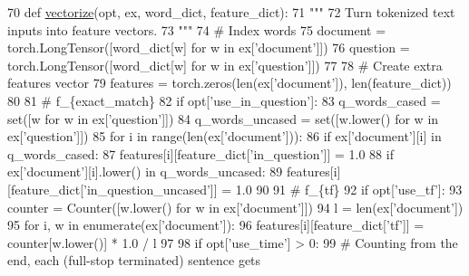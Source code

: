 \begin{DoxyCode}
70 \textcolor{keyword}{def }\hyperlink{namespaceparlai_1_1agents_1_1drqa_1_1utils_a5c76cc39e3014c7bcf9199d566dbdc0f}{vectorize}(opt, ex, word\_dict, feature\_dict):
71     \textcolor{stringliteral}{"""}
72 \textcolor{stringliteral}{    Turn tokenized text inputs into feature vectors.}
73 \textcolor{stringliteral}{    """}
74     \textcolor{comment}{# Index words}
75     document = torch.LongTensor([word\_dict[w] \textcolor{keywordflow}{for} w \textcolor{keywordflow}{in} ex[\textcolor{stringliteral}{'document'}]])
76     question = torch.LongTensor([word\_dict[w] \textcolor{keywordflow}{for} w \textcolor{keywordflow}{in} ex[\textcolor{stringliteral}{'question'}]])
77 
78     \textcolor{comment}{# Create extra features vector}
79     features = torch.zeros(len(ex[\textcolor{stringliteral}{'document'}]), len(feature\_dict))
80 
81     \textcolor{comment}{# f\_\{exact\_match\}}
82     \textcolor{keywordflow}{if} opt[\textcolor{stringliteral}{'use\_in\_question'}]:
83         q\_words\_cased = set([w \textcolor{keywordflow}{for} w \textcolor{keywordflow}{in} ex[\textcolor{stringliteral}{'question'}]])
84         q\_words\_uncased = set([w.lower() \textcolor{keywordflow}{for} w \textcolor{keywordflow}{in} ex[\textcolor{stringliteral}{'question'}]])
85         \textcolor{keywordflow}{for} i \textcolor{keywordflow}{in} range(len(ex[\textcolor{stringliteral}{'document'}])):
86             \textcolor{keywordflow}{if} ex[\textcolor{stringliteral}{'document'}][i] \textcolor{keywordflow}{in} q\_words\_cased:
87                 features[i][feature\_dict[\textcolor{stringliteral}{'in\_question'}]] = 1.0
88             \textcolor{keywordflow}{if} ex[\textcolor{stringliteral}{'document'}][i].lower() \textcolor{keywordflow}{in} q\_words\_uncased:
89                 features[i][feature\_dict[\textcolor{stringliteral}{'in\_question\_uncased'}]] = 1.0
90 
91     \textcolor{comment}{# f\_\{tf\}}
92     \textcolor{keywordflow}{if} opt[\textcolor{stringliteral}{'use\_tf'}]:
93         counter = Counter([w.lower() \textcolor{keywordflow}{for} w \textcolor{keywordflow}{in} ex[\textcolor{stringliteral}{'document'}]])
94         l = len(ex[\textcolor{stringliteral}{'document'}])
95         \textcolor{keywordflow}{for} i, w \textcolor{keywordflow}{in} enumerate(ex[\textcolor{stringliteral}{'document'}]):
96             features[i][feature\_dict[\textcolor{stringliteral}{'tf'}]] = counter[w.lower()] * 1.0 / l
97 
98     \textcolor{keywordflow}{if} opt[\textcolor{stringliteral}{'use\_time'}] > 0:
99         \textcolor{comment}{# Counting from the end, each (full-stop terminated) sentence gets}

\end{DoxyCode}
